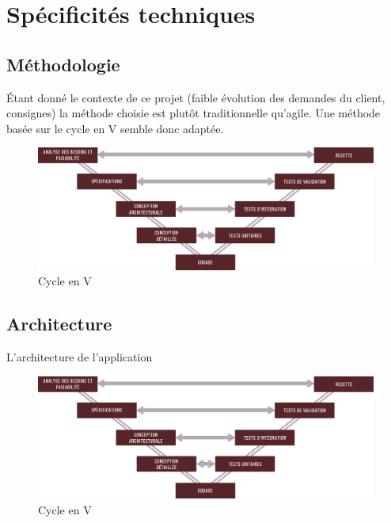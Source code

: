 \section{\textbf{Spécificités techniques}}

\subsection{\textbf{Méthodologie}}
	Étant donné le contexte de ce projet (faible évolution des demandes du client, consignes) la méthode choisie est plutôt traditionnelle qu'agile. Une méthode basée sur le cycle en V semble donc adaptée. 
	
\begin{figure}[htbp]
	\caption{\label{fig:CEV} Cycle en V}
	\includegraphics[width=1\textwidth]{CycleEnV.png}
\end{figure}

\subsection{\textbf{Architecture}}
	L'architecture de l'application 
	
\begin{figure}[htbp]
	\caption{\label{fig:CEV} Cycle en V}
	\includegraphics[width=1\textwidth]{CycleEnV.png}
\end{figure}
	
